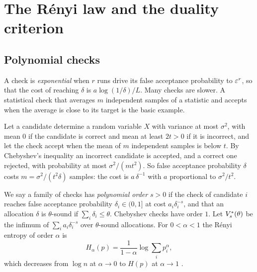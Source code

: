 \section{The R\'enyi law and the duality criterion}\label{sec:renyi}

\subsection{Polynomial checks}

A check is \emph{exponential} when $r$ runs drive its false acceptance probability to $\varepsilon^{r}$, so that the cost of reaching $\delta$ is $a\log(1/\delta)/L$. Many checks are slower. A statistical check that averages $m$ independent samples of a statistic and accepts when the average is close to its target is the basic example.

\begin{example}\label{ex:chebyshev}
Let a candidate determine a random variable $X$ with variance at most $\sigma^{2}$, with mean $0$ if the candidate is correct and mean at least $2t>0$ if it is incorrect, and let the check accept when the mean of $m$ independent samples is below $t$. By Chebyshev's inequality an incorrect candidate is accepted, and a correct one rejected, with probability at most $\sigma^{2}/(mt^{2})$. So false acceptance probability $\delta$ costs $m=\sigma^{2}/(t^{2}\delta)$ samples: the cost is $a\,\delta^{-1}$ with $a$ proportional to $\sigma^{2}/t^{2}$.
\end{example}

We say a family of checks has \emph{polynomial order} $s>0$ if the check of candidate $i$ reaches false acceptance probability $\delta_{i}\in(0,1]$ at cost $a_{i}\delta_{i}^{-s}$, and that an allocation $\delta$ is $\theta$-sound if $\sum_{i}\delta_{i}\le\theta$. Chebyshev checks have order $1$. Let $V^{*}_{s}(\theta)$ be the infimum of $\sum_{i}a_{i}\delta_{i}^{-s}$ over $\theta$-sound allocations. For $0<\alpha<1$ the R\'enyi entropy of order $\alpha$ is
\[
H_{\alpha}(p)=\frac1{1-\alpha}\log\sum_{i}p_{i}^{\alpha},
\]
which decreases from $\log n$ at $\alpha\to0$ to $H(p)$ at $\alpha\to1$ \cite{Ren61,CT06}.

